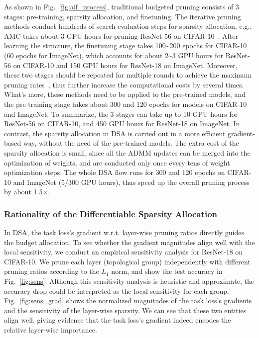 \documentclass[runningheads]{llncs}
\begin{document}
  As shown in Fig.~\ref{fig:aif_process}, traditional budgeted pruning consists of 3 stages: pre-training, sparsity allocation, and finetuning. 
  The iterative pruning methods conduct hundreds of search-evaluation steps for sparsity allocation, e.g., AMC takes about 3 GPU hours for pruning ResNet-56 on CIFAR-10~\cite{PFS}. After learning the structure, the finetuning stage takes 100\~{}200 epochs for CIFAR-10 (60 epochs for ImageNet), which accounts for about 2\~{}3 GPU hours for ResNet-56 on CIFAR-10 and 150 GPU hours for ResNet-18 on ImageNet. Moreover, these two stages should be repeated for multiple rounds to achieve the maximum pruning rates~\cite{netadapt,autocompress}, thus further increase the computational costs by several times. 
  What's more, these methods need to be applied to the pre-trained models, and the pre-training stage takes about 300 and 120 epochs for models on CIFAR-10 and ImageNet. To summarize, the 3 stages can take up to 10 GPU hours for ResNet-56 on CIFAR-10, and 450 GPU hours for ResNet-18 on ImageNet. 
  In contrast, the sparsity allocation in DSA is carried out in a more efficient gradient-based way, without the need of the pre-trained models. The extra cost of the sparsity allocation is small, since all the ADMM updates can be merged into the optimization of weights, and are conducted only once every tens of weight optimization steps. 
  The whole DSA flow runs for 300 and 120 epochs on CIFAR-10 and ImageNet (5/300 GPU hours), thus speed up the overall pruning process by about 1.5$\times$.  
  
  
  \subsubsection{Rationality of the Differentiable Sparsity Allocation}
  \label{sec:rational}
  
  In DSA, the task loss's gradient w.r.t. layer-wise pruning ratios directly guides the budget allocation. To see whether the gradient magnitudes align well with the local sensitivity, we conduct an empirical sensitivity analysis for ResNet-18 on CIFAR-10. We prune each layer (topological group) independently with different pruning ratios according to the $L_1$ norm, and show the test accuracy in Fig.~\ref{fig:sens}. Although this sensitivity analysis is heuristic and approximate, the accuracy drop could be interpreted as the local sensitivity for each group. Fig.~\ref{fig:sens_grad} shows the normalized magnitudes of the task loss's gradients and the sensitivity of the layer-wise sparsity. We can see that these two entities align well, giving evidence that the task loss's gradient indeed encodes the relative layer-wise importance.
  
\end{document}
